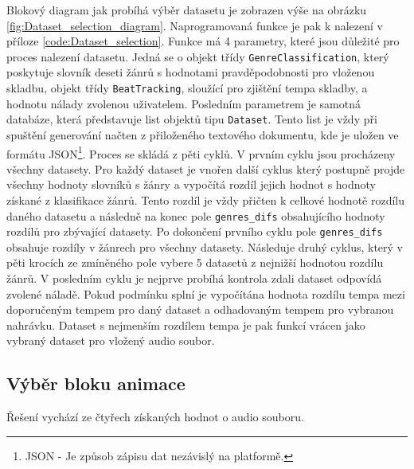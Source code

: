 Blokový diagram jak probíhá výběr datasetu je zobrazen výše na obrázku \ref{fig:Dataset_selection_diagram}. Naprogramovaná funkce je pak k nalezení v příloze \ref{code:Dataset_selection}. Funkce má 4 parametry, které jsou důležité pro proces nalezení datasetu. Jedná se o objekt třídy \texttt{GenreClassification}, který poskytuje slovník deseti žánrů s hodnotami pravděpodobnosti pro vloženou skladbu, objekt třídy \texttt{BeatTracking}, sloužící pro zjištění tempa skladby, a hodnotu nálady zvolenou uživatelem. Posledním parametrem je samotná databáze, která představuje list objektů tipu \texttt{Dataset}. Tento list je vždy při spuštění generování načten z přiloženého textového dokumentu, kde je uložen ve formátu \acs{JSON}\footnote{JSON - Je způsob zápisu dat nezávislý na platformě.\cite{JSON}}. Proces se skládá z pěti cyklů. V prvním cyklu jsou procházeny všechny datasety. Pro každý dataset je vnořen další cyklus který postupně projde všechny hodnoty slovníků s žánry a vypočítá rozdíl jejich hodnot s hodnoty získané z klasifikace žánrů. Tento rozdíl je vždy přičten k celkové hodnotě rozdílu daného datasetu a následně na konec pole \texttt{genres\_difs} obsahujícího hodnoty rozdílů pro zbývající datasety. Po dokončení prvního cyklu pole \texttt{genres\_difs} obsahuje rozdíly v žánrech pro všechny datasety. Následuje druhý cyklus, který v pěti krocích ze zmíněného pole vybere 5 datasetů z nejnižší hodnotou rozdílu žánrů. V posledním cyklu je nejprve probíhá kontrola zdali dataset odpovídá zvolené náladě. Pokud podmínku splní je vypočítána hodnota rozdílu tempa mezi doporučeným tempem pro daný dataset a odhadovaným tempem pro vybranou nahrávku. Dataset s nejmenším rozdílem tempa je pak funkcí vrácen jako vybraný dataset pro vložený audio soubor. 

\subsection{Výběr bloku animace} \label{sec:Vyber_bloku_animace}

Řešení vychází ze čtyřech získaných hodnot o audio souboru.

